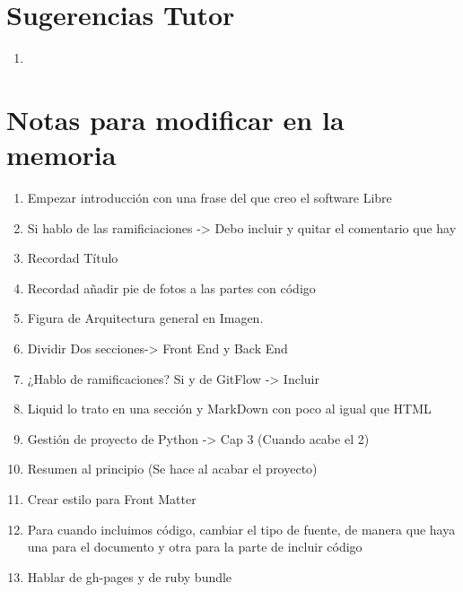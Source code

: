 \documentclass[a4paper, 12pt]{book}
\begin{document}
\chapter*{Sugerencias Tutor}
\begin{enumerate}
    \item 
\end{enumerate}

\chapter*{Notas para modificar en la memoria}
\begin{enumerate}
    \item Empezar introducción con una frase del que creo el software Libre
    \item Si hablo de las ramificiaciones -> Debo incluir y quitar el comentario que hay 
    \item Recordad Título
    \item Recordad añadir pie de fotos a las partes con código
    \item Figura de Arquitectura general en Imagen.
    \item Dividir Dos secciones-> Front End y Back End
    \item ¿Hablo de ramificaciones? Si y de GitFlow -> Incluir
    \item Liquid lo trato en una sección y MarkDown con poco al igual que HTML
    \item Gestión de proyecto de Python -> Cap 3 (Cuando acabe el 2)
    \item Resumen al principio (Se hace al acabar el proyecto)
    \item Crear estilo para Front Matter
    \item Para cuando incluimos código, cambiar el tipo de fuente, de manera que haya una para el documento y otra para la parte de incluir código
    \item Hablar de gh-pages y de ruby bundle
\end{enumerate}
\end{document}
